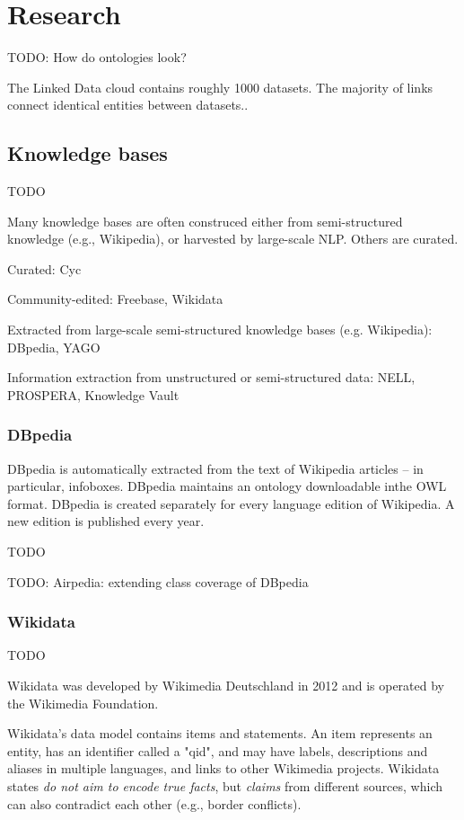 \chapter{Research}

TODO: How do ontologies look?

The Linked Data cloud contains roughly 1000 datasets. The majority of links
connect identical entities between datasets.\cite{kg-refinement-survey}.

\section{Knowledge bases}

TODO

Many knowledge bases are often construced either from semi-structured knowledge
(e.g., Wikipedia), or harvested by large-scale NLP. Others are curated.

Curated: Cyc

Community-edited: Freebase, Wikidata

Extracted from large-scale semi-structured knowledge bases (e.g. Wikipedia):
DBpedia, YAGO

Information extraction from unstructured or semi-structured data: NELL,
PROSPERA, Knowledge Vault

\subsection{DBpedia}

DBpedia is automatically extracted from the text of Wikipedia articles -- in
particular, infoboxes.
DBpedia maintains an ontology downloadable inthe OWL format.
DBpedia is created separately for every language edition of Wikipedia.
A new edition is published every year.

TODO

TODO: Airpedia: extending class coverage of DBpedia

\subsection{Wikidata}

TODO

Wikidata was developed by Wikimedia Deutschland in 2012 and is operated by the
Wikimedia Foundation.

Wikidata's data model contains items and statements. An item represents an
entity, has an identifier called a "qid", and may have labels, descriptions and
aliases in multiple languages, and links to other Wikimedia projects. Wikidata
states \textit{do not aim to encode true facts}, but \textit{claims} from
different sources, which can also contradict each other (e.g., border
conflicts).

